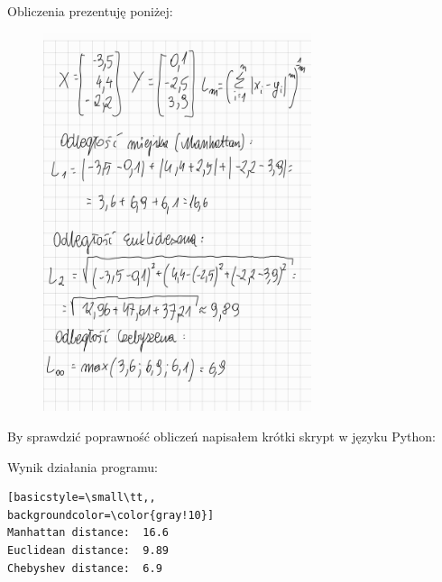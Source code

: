 \documentclass{article}
\begin{document}
Obliczenia prezentuję poniżej:
\begin{figure}[H]
    \centering
    \includegraphics[width=0.7\textwidth]{rozwiazanie.jpg}
\end{figure}

By sprawdzić poprawność obliczeń napisałem krótki skrypt w języku Python:


Wynik działania programu:
\begin{lstlisting}[basicstyle=\small\tt,,
backgroundcolor=\color{gray!10}]
Manhattan distance:  16.6
Euclidean distance:  9.89
Chebyshev distance:  6.9
\end{lstlisting}
\end{document}
